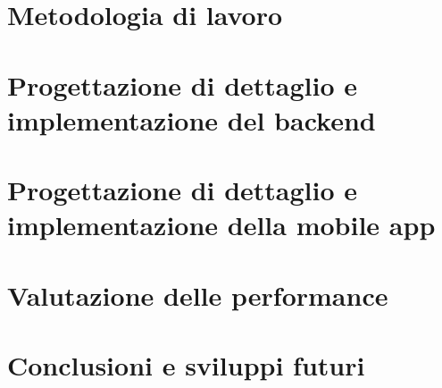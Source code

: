 \documentclass[11pt,english,italian,openright]{book}
\begin{document}



\chapter{Metodologia di lavoro\label{ch:metodologia}}




\chapter{Progettazione di dettaglio e implementazione del backend\label{ch:implementazione-backend}}




\chapter{Progettazione di dettaglio e implementazione della mobile app\label{ch:implementazione-app}}




\chapter{Valutazione delle performance\label{ch:performance}}




\chapter{Conclusioni e sviluppi futuri\label{ch:conclusioni}}






\cleardoublepage{}
\end{document}
